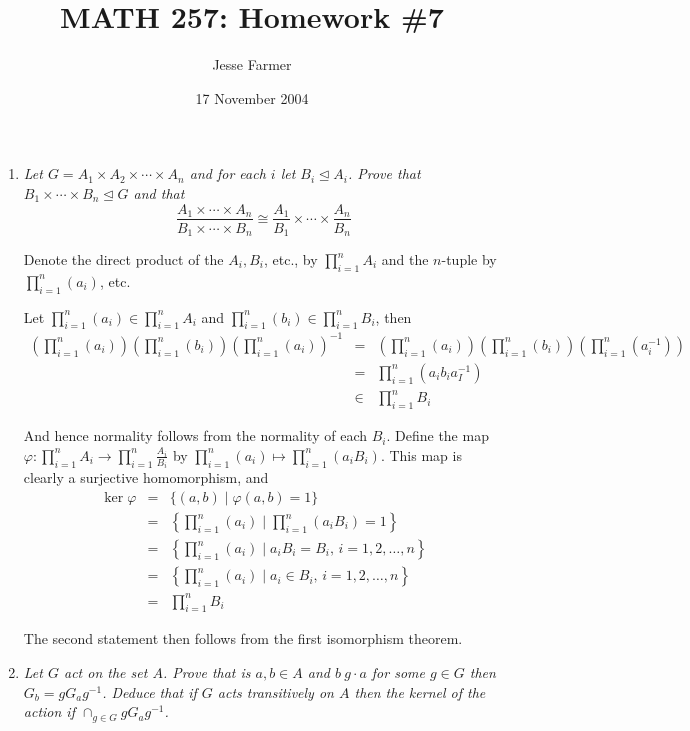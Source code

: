 \documentclass[letterpaper, 11pt]{article}
\title{MATH 257: Homework \#7}
\author{Jesse Farmer}
\date{17 November 2004}
\begin{document}
\maketitle
\begin{enumerate}

\item \emph{Let $G = A_1 \times A_2 \times \cdots \times A_n$ and for each $i$ let $B_i \unlhd A_i$.  Prove that $B_1 \times \cdots \times B_n \unlhd G$ and that $$\frac{A_1 \times \cdots \times A_n}{B_1 \times \cdots \times B_n} \cong \frac{A_1}{B_1} \times \cdots \times \frac{A_n}{B_n}$$}


Denote the direct product of the $A_i, B_i$, etc., by $\prod_{i=1}^n A_i$ and the $n$-tuple by $\prod_{i=1}^n (a_i)$, etc.

Let $\prod_{i=1}^n (a_i) \in \prod_{i=1}^n A_i$ and $\prod_{i=1}^n (b_i) \in \prod_{i=1}^n B_i$, then 
\begin{eqnarray*}
\left(\prod_{i=1}^n (a_i)\right)
\left(\prod_{i=1}^n (b_i)\right)
\left(\prod_{i=1}^n (a_i)\right)^{-1} &=&
\left(\prod_{i=1}^n (a_i)\right)
\left(\prod_{i=1}^n (b_i)\right)
\left(\prod_{i=1}^n (a_i^{-1})\right) \\ &=& 
\prod_{i=1}^n (a_ib_ia_I^{-1}) \\ &\in& \prod_{i=1}^n B_i
\end{eqnarray*}

And hence normality follows from the normality of each $B_i$.  Define the map $\varphi: \prod_{i=1}^n A_i \rightarrow \prod_{i=1}^n \frac{A_i}{B_i}$ by $\prod_{i=1}^n (a_i) \mapsto \prod_{i=1}^n (a_iB_i)$.  This map is clearly a surjective homomorphism, and 
\begin{eqnarray*}
\ker \varphi &=& \{(a,b) \mid \varphi(a,b) = 1 \} \\
&=& \left\{\prod_{i=1}^n (a_i) \mid \prod_{i=1}^n (a_iB_i) = 1\right\} \\
&=& \left\{\prod_{i=1}^n (a_i) \mid a_iB_i = B_i,\, i=1,2,\ldots,n\right\} \\
&=& \left\{\prod_{i=1}^n (a_i) \mid a_i \in B_i,\, i=1,2,\ldots,n\right\} \\
&=& \prod_{i=1}^n B_i
\end{eqnarray*}

The second statement then follows from the first isomorphism theorem.

\item \emph{Let $G$ act on the set $A$.  Prove that is $a,b \in A$ and $b \ g \cdot a$ for some $g \in G$ then $G_b = gG_ag^{-1}$.  Deduce that if $G$ acts transitively on $A$ then the kernel of the action if $\cap_{g \in G} gG_ag^{-1}$.}


\end{enumerate}
\end{document}
